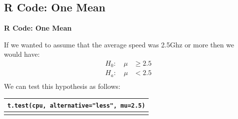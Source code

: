\documentclass[compress]{beamer}        %
\makeatletter
\newcommand{\tcb}{\textcolor{beamer@blendedblue}}
\makeatother
\begin{document}
\subsection{R Code: One Mean}
\begin{frame}{\bf \tcb{R Code: One Mean}}

If we wanted to assume that the average speed was 2.5Ghz or more then we would have:\\[-0.4cm]
\begin{align*}
H_0: \quad \mu &\ge 2.5\\[0.2cm]
H_a: \quad \mu &< 2.5\\[-0.2cm]
\end{align*}
We can test this hypothesis as follows:\\[0.4cm]
\begin{tabular}{|l|}
\hline
\texttt{t.test(cpu, alternative="less", mu=2.5)}\\
\hline
\multicolumn{1}{c}{}\\[0.2cm]
\end{tabular}

\end{frame}
\end{document}
